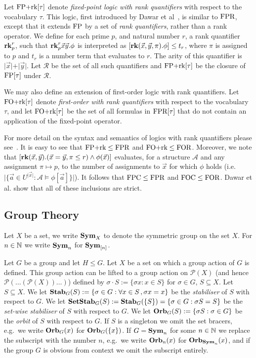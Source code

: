\documentclass[../paper.tex]{subfiles}
\begin{document}
Let $\text{\upshape FP+rk}[\tau]$ denote \emph{fixed-point logic with rank quantifiers} with
respect to the vocabulary $\tau$. This logic, first introduced by Dawar et
al~\cite{Dawar09logicswith}, is similar to $\text{\upshape FPR}$, except that it extends $\text{\upshape FP}$
by a set of \emph{rank quantifiers}, rather than a rank operator. We define for each prime
$p$, and natural number $r$, a rank quantifier $\text{\textbf{rk}}^r_p$, such that
$\text{\textbf{rk}}^r_p\vec{x}\vec{y}. \phi$ is interpreted as $[\text{\textbf{rk}} (\vec{x}, \vec{y},
\pi) . \phi] \leq t_r$, where $\pi$ is assigned to $p$ and $t_r$ is a number
term that evaluates to $r$. The arity of this quantifier is $\vert \vec{x} \vert
+ \vert \vec{y} \vert$. Let $\mathcal{R}$ be the set of all such quantifiers and
$\text{\upshape FP+rk}[\tau]$ be the closure of $\text{\upshape FP}[\tau]$ under $\mathcal{R}$.

We may also define an extension of first-order logic with rank quantifiers. Let
$\text{\upshape FO+rk}[\tau]$ denote \emph{first-order with rank quantifiers} with respect to
the vocabulary $\tau$, and let $\text{\upshape FO+rk}[\tau]$ be the set of all formulas in
$\text{\upshape FPR}[\tau]$ that do not contain an application of the fixed-point operator.

For more detail on the syntax and semantics of logics with rank quantifiers please
see~\cite{Dawar09logicswith}. It is easy to see that $\text{\upshape FP+rk} \leq \text{\upshape FPR}$ and
$\text{\upshape FO+rk} \leq \text{\upshape FOR}$. Moreover, we note that $[\text{\textbf{rk}}(\vec{x}, \vec{y}). (\vec{x} =
\vec{y}, \pi \leq r) \land \phi(\vec{x})]$ evaluates, for a structure
$\mathcal{A}$ and any assignment $\pi \mapsto p$, to the number of assignments
to $\vec{x}$ for which $\phi$ holds (i.e.\ $\vert \{\vec{a} \in U^{\vert \vec{x}
  \vert} : \mathcal{A} \models \phi[\vec{a}]\} \vert$). It follows that $\text{\upshape FPC}
\leq \text{\upshape FPR}$ and $\text{\upshape FOC} \leq \text{\upshape FOR}$. Dawar et al.\cite{Dawar09logicswith} show that
all of these inclusions are strict.

\subsection{Group Theory}
Let $X$ be a set, we write $\text{\textbf{Sym}}_X$ to denote the symmetric group on the set
$X$. For $n \in \mathbb{N}$ we write $\text{\textbf{Sym}}_n$ for $\text{\textbf{Sym}}_{[n]}$.

Let $G$ be a group and let $H \leq G$. Let $X$ be a set on which a group action
of $G$ is defined. This group action can be lifted to a group action on
$\mathcal{P}(X)$ (and hence $\mathcal{P}(\ldots(\mathcal{P}(X))\ldots)$) defined
by $\sigma \cdot S := \{\sigma x : x \in S\}$ for $\sigma \in G$, $S \subseteq
X$. Let $S \subseteq X$. We let $\text{\textbf{Stab}}_G(S) := \{\sigma \in G : \forall x \in S
\,, \sigma x = x\}$ be the \emph{stabiliser} of $S$ with respect to $G$. We let
$\text{\textbf{SetStab}}_G(S) := \text{\textbf{Stab}}_G(\{S\}) = \{\sigma \in G : \sigma S = S\}$ be the
\emph{set-wise stabiliser} of $S$ with respect to $G$. We let $\text{\textbf{Orb}}_G(S) :=
\{\sigma S : \sigma \in G\}$ be the \emph{orbit} of $S$ with respect to $G$. If
$S$ is a singleton we omit the set bracers, e.g.\ we write $\text{\textbf{Orb}}_G(x)$ for
$\text{\textbf{Orb}}_G(\{x\})$. If $G = \text{\textbf{Sym}}_n$ for some $n \in \mathbb{N}$ we replace the subscript
with the number $n$, e.g.\ we write $\text{\textbf{Orb}}_n(x)$ for $\text{\textbf{Orb}}_{\text{\textbf{Sym}}_n}(x)$, and if
the group $G$ is obvious from context we omit the subscript entirely.
\end{document}
